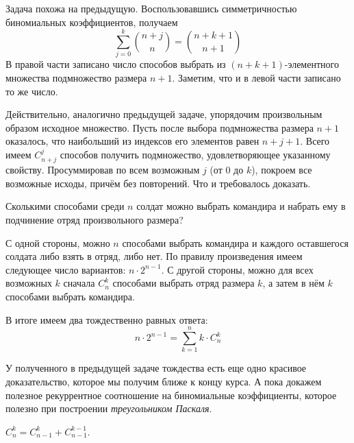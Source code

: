 \begin{Answer}
\begin{enumerate}
            Задача похожа на предыдущую.
            Воспользовавшись симметричностью биномиальных коэффициентов, получаем
            \[
                \sum_{j=0}^k \binom{n + j}{n} = \binom{n + k + 1}{n + 1}
            \]
            В правой части записано число способов выбрать из $ (n+k+1) $-элементного множества подмножество размера $ n + 1 $.
            Заметим, что и в левой части записано то же число.

            Действительно, аналогично предыдущей задаче, упорядочим произвольным образом исходное множество.
            Пусть после выбора подмножества размера $ n + 1 $ оказалось, что наибольший из индексов его элементов равен $ n + j + 1 $.
            Всего имеем $ C_{n+j}^j $ способов получить подмножество, удовлетворяющее указанному свойству.
            Просуммировав по всем возможным $ j $ (от $ 0 $ до $ k $), покроем все возможные исходы, причём без повторений.
            Что и требовалось доказать.
    \end{enumerate}
\end{Answer}

\begin{Exercise}[counter=SecExercise]
    \noindent
    Сколькими способами среди $ n $ солдат можно выбрать командира и набрать ему в подчинение отряд произвольного размера?
\end{Exercise}

\begin{Answer}
    \noindent
    С одной стороны, можно $ n $ способами выбрать командира и каждого оставшегося солдата либо взять в отряд, либо нет.
    По правилу произведения имеем следующее число вариантов: $ n \cdot 2^{n-1} $.
    С другой стороны, можно для всех возможных $ k $ сначала $ C_n^k $ способами выбрать отряд размера $ k $,
    а затем в нём $ k $ способами выбрать командира.

    В итоге имеем два тождественно равных ответа:
    \[
        n \cdot 2^{n-1} = \sum_{k=1}^n k \cdot C_n^k
    \]
\end{Answer}

У полученного в предыдущей задаче тождества есть еще одно красивое доказательство,
которое мы получим ближе к концу курса.
А пока докажем полезное рекуррентное соотношение на биномиальные коэффициенты,
которое полезно при построении \emph{треугольником Паскаля}.

\begin{statement}
    $ C_n^k = C_{n-1}^k + C_{n-1}^{k-1} $.
\end{statement}

